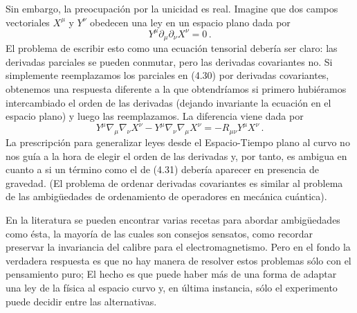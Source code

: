 \documentclass[11pt,b5paper,openany,twoside]{book}
\newcommand{\mn}{{\mu\nu}}
\newcommand{\p}[1]{{\partial_{#1}}}
\begin{document}
Sin embargo, la preocupación por la unicidad es real.
Imagine que dos campos vectoriales $X^\mu$ y $Y^\nu$ obedecen una ley en un espacio plano dada por
\begin{equation}
Y^\mu\p\mu \p\nu X^\nu = 0\,.\label{4.30}
\end{equation}
El problema de escribir esto como una ecuación tensorial debería ser claro: las derivadas parciales se pueden conmutar, pero las derivadas covariantes no.
Si simplemente reemplazamos los parciales en (4.30) por derivadas covariantes, obtenemos una respuesta diferente a la que obtendríamos si primero hubiéramos intercambiado el orden de las derivadas (dejando invariante la ecuación en el espacio plano) y luego las reemplazamos.
La diferencia viene dada por
\begin{equation}
Y^\mu\nabla_\mu \nabla_\nu X^\nu-Y^\mu\nabla_\nu \nabla_\mu X^\nu
= -R_{\mn}Y^\mu X^\nu\,.\label{4.31}
\end{equation}
La prescripción para generalizar leyes desde el Espacio-Tiempo plano al curvo no nos guía a la hora de elegir el orden de las derivadas y, por tanto, es ambigua en cuanto a si un término como el de (4.31) debería aparecer en presencia de gravedad.
(El problema de ordenar derivadas covariantes es similar al problema de las ambigüedades de ordenamiento de operadores en mecánica cuántica).

En la literatura se pueden encontrar varias recetas para abordar ambigüedades como ésta, la mayoría de las cuales son consejos sensatos, como recordar preservar la invariancia del calibre para el electromagnetismo.
Pero en el fondo la verdadera respuesta es que no hay manera de resolver estos problemas sólo con el pensamiento puro; El hecho es que puede haber más de una forma de adaptar una ley de la física al espacio curvo y, en última instancia, sólo el experimento puede decidir entre las alternativas.
\end{document}
